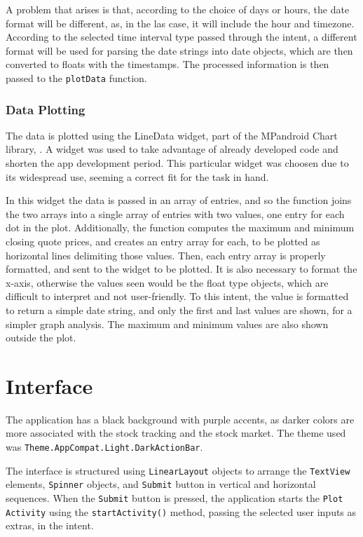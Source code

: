 \documentclass{article}
\begin{document}
A problem that arises is that, according to the choice of days or hours, the date format will be different, as, in the las case, it will include the hour and timezone.
According to the selected time interval type passed through the intent, a different format will be used for parsing the date strings into date objects, which are then converted to floats with the timestamps.
The processed information is then passed to the \texttt{plotData} function.

\subsubsection{Data Plotting}
The data is plotted using the LineData widget, part of the MPandroid Chart library, \cite{MPAndroidChart}.
A widget was used to take advantage of already developed code and shorten the app development period.
This particular widget was choosen due to its widespread use, seeming a correct fit for the task in hand.

In this widget the data is passed in an array of entries, and so the function joins the two arrays into a single array of entries with two values, one entry for each dot in the plot.
Additionally, the function computes the maximum and minimum closing quote prices, and creates an entry array for each, to be plotted as horizontal lines delimiting those values.
Then, each entry array is properly formatted, and sent to the widget to be plotted.
It is also necessary to format the x-axis, otherwise the values seen would be the float type objects, which are difficult to interpret and not user-friendly.
To this intent, the value is formatted to return a simple date string, and only the first and last values are shown, for a simpler graph analysis.
The maximum and minimum values are also shown outside the plot.

\section{Interface}
The application has a black background with purple accents, as darker colors are more associated with the stock tracking and the stock market. The theme used was \texttt{Theme.AppCompat.Light.DarkActionBar}.

The interface is structured using \texttt{LinearLayout} objects to arrange the \texttt{TextView} elements, \texttt{Spinner} objects, and \texttt{Submit} button in vertical and horizontal sequences. When the \texttt{Submit} button is pressed, the application starts the \texttt{Plot Activity} using the \texttt{startActivity()} method, passing the selected user inputs as extras, in the intent.
\end{document}
